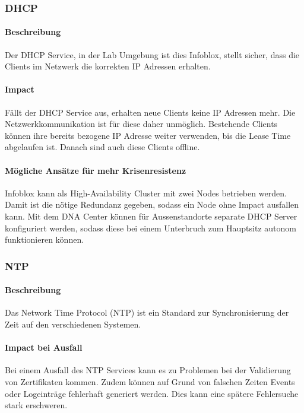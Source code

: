 \subsubsection{DHCP}

\paragraph{Beschreibung}

Der DHCP Service, in der Lab Umgebung ist dies Infoblox, stellt sicher, dass die Clients im Netzwerk die korrekten IP Adressen erhalten.

\paragraph{Impact}

Fällt der DHCP Service aus, erhalten neue Clients keine IP Adressen mehr. Die Netzwerkkommunikation ist für diese daher unmöglich. Bestehende Clients können ihre bereits bezogene IP Adresse weiter verwenden, bis die Lease Time abgelaufen ist. Danach sind auch diese Clients offline.

\paragraph{Mögliche Ansätze für mehr Krisenresistenz}

Infoblox kann als High-Availability Cluster mit zwei Nodes betrieben werden. Damit ist die nötige Redundanz gegeben, sodass ein Node ohne Impact ausfallen kann. Mit dem DNA Center können für Aussenstandorte separate DHCP Server konfiguriert werden, sodass diese bei einem Unterbruch zum Hauptsitz autonom funktionieren können.


\subsubsection{NTP}
\paragraph{Beschreibung}
Das Network Time Protocol (NTP) ist ein Standard zur Synchronisierung der Zeit auf den verschiedenen Systemen.

\paragraph{Impact bei Ausfall}
Bei einem Ausfall des NTP Services kann es zu Problemen bei der Validierung von Zertifikaten kommen. Zudem können auf Grund von falschen Zeiten Events oder Logeinträge fehlerhaft generiert werden. Dies kann eine spätere Fehlersuche stark erschweren.

